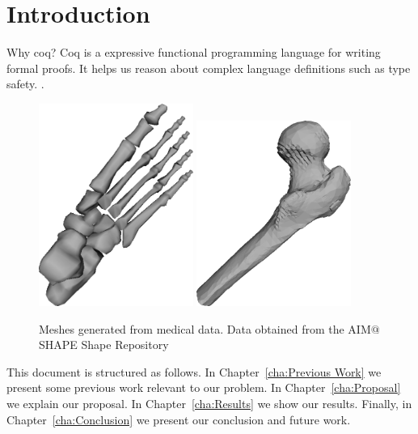 
\chapter{Introduction}
Why coq? Coq is a expressive functional programming language for writing formal proofs. It helps us reason about complex language definitions such as type safety. \cite{Pierce:SF1}.


\begin{figure}
\centering
\includegraphics[width=0.45\textwidth]{pictures/image01.png}
\includegraphics[width=0.45\textwidth]{pictures/image02.png}
\caption{Meshes generated from medical data. Data obtained from the AIM$@$SHAPE Shape Repository \cite{AIMSHAPE}}
\label{fig:example}
\end{figure}


This document is structured as follows. In Chapter~\ref{cha:Previous Work} we present some previous work relevant to our problem. In Chapter~\ref{cha:Proposal} we explain our proposal. In Chapter~\ref{cha:Results} we show our results. Finally, in Chapter~\ref{cha:Conclusion} we present our conclusion and future work.


